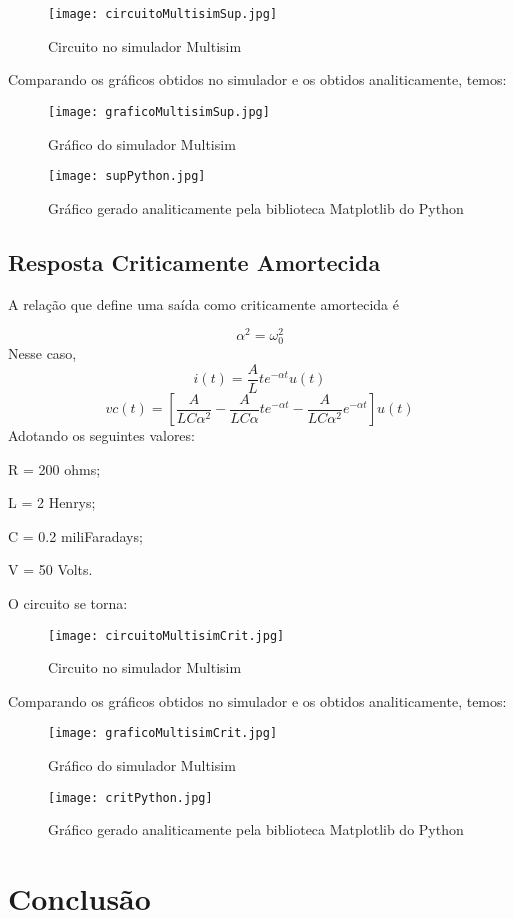 \documentclass[12pt]{article}
\begin{document}
	\begin{figure}[!h]
		\centering
		\texttt{[image: circuitoMultisimSup.jpg]}
		\caption{Circuito no simulador Multisim}
	\end{figure}
	
	Comparando os gráficos obtidos no simulador e os obtidos analiticamente, temos:
	
	\begin{figure}[!h]
		\centering
		\texttt{[image: graficoMultisimSup.jpg]}
		\caption{Gráfico do simulador Multisim}
	\end{figure}
	\begin{figure}[!h]
		\centering
		\texttt{[image: supPython.jpg]}
		\caption{Gráfico gerado analiticamente pela biblioteca Matplotlib do Python}
	\end{figure}
	\pagebreak
	\vspace*{2cm}
	\subsection{Resposta Criticamente Amortecida}
	A relação que define uma saída como criticamente amortecida é 
	
	\begin{equation}
		\alpha^2 = \omega_0 ^2
	\end{equation}
	Nesse caso,
	\begin{equation}
		i(t) = \frac{A}{L}te^{-\alpha t}u(t)
	\end{equation}
	\begin{equation}
		vc(t) = [\frac{A}{LC\alpha^2 } - \frac{A}{LC\alpha}te^{-\alpha t} - \frac{A}{LC\alpha^2}e^{-\alpha t}]u(t)
	\end{equation}
	Adotando os seguintes valores: 

	R = 200 ohms; 
	
	L = 2 Henrys;
	
	C = 0.2 miliFaradays; 
	
	V = 50 Volts.
	
	O circuito se torna:
	
	\begin{figure}[!h]
		\centering
		\texttt{[image: circuitoMultisimCrit.jpg]}
		\caption{Circuito no simulador Multisim}
	\end{figure}
	
	Comparando os gráficos obtidos no simulador e os obtidos analiticamente, temos:
	\begin{figure}[!h]
		\centering
		\texttt{[image: graficoMultisimCrit.jpg]}
		\caption{Gráfico do simulador Multisim}
	\end{figure}
		\begin{figure}[!h]
		\centering
		\texttt{[image: critPython.jpg]}
		\caption{Gráfico gerado analiticamente pela biblioteca Matplotlib do Python}
	\end{figure}
	\pagebreak
	\vspace*{2cm}
	\section{Conclusão}
	
	
\end{document}

